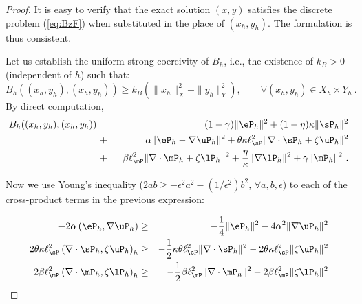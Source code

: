 \begin{proof}
	It is easy to verify that the exact solution $(x,y)$ satisfies the discrete problem (\ref{eq:BzF}) when substituted in the place of $(x_h,y_h)$. The formulation is thus consistent.
	
	Let us establish the uniform strong coercivity of $B_h$, i.e., the existence of $k_{B}>0$ (independent of $h$) such that:
	\begin{equation}
		B_h((x_h,y_h),(x_h,y_h))\geq k_B \left ( \|x_h\|_X^2 + \|y_h\|_Y^2 \right ),\qquad \forall (x_h,y_h)\in X_h\times Y_h~.
	\end{equation}
	By direct computation, 
	\begin{eqnarray}
		B_h((x_h,y_h),(x_h,y_h)) ~&=&~ (1-\gamma) \|\eP_h\|^2 + (1-\eta)\kappa \|\sP_h\|^2 \nonumber \\
		~&+&~ \alpha \|\eP_h-\nabla \uP_h\|^2 + \theta \kappa \ell_{\sP}^2 \|\nabla \cdot \sP_h + \zeta \uP_h\|^2 \nonumber \\
		~&+&~ \beta \ell_{\mP}^2 \| \nabla \cdot \mP_h + \zeta \lP_h \|^2
		+ \frac{\eta}{\kappa} \|\nabla \lP_h\|^2 + \gamma \|\mP_h\|^2~.
	\end{eqnarray}
	
	Now we use Young's inequality ($2ab\geq -\epsilon^2 a^2-(1/\epsilon^2)b^2$, $\forall a,b, \epsilon$) to each of the cross-product terms in the previous expression:
	
	\begin{eqnarray}
		-2\alpha \left (\eP_h,\nabla \uP_h \right ) & \geq & -\frac14 \|\eP_h\|^2 - 4\alpha^2 \|\nabla \uP_h \|^2 \\
		2\theta\kappa \ell_{\sP}^2\left ( \nabla \cdot \sP_h, \zeta \uP_h \right )_h& \geq & - \frac12 \kappa \theta \ell_{\sP}^2 \|\nabla\cdot \sP_h\|^2 - {2\theta\kappa\ell_{\sP}^2}\|\zeta \uP_h\|^2\\
		2 \beta \ell_{\mP}^2\left ( \nabla \cdot \mP_h, \zeta \lP_h \right )_h& \geq & - \frac12 {\beta} \ell_{\mP}^2 \|\nabla\cdot \mP_h\|^2 - {2\beta\ell_{\mP}^2}\|\zeta \lP_h\|^2
	\end{eqnarray}
	

\end{proof}
